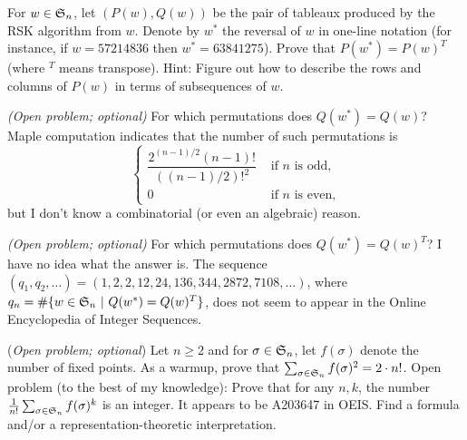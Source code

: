 \bigskip%

\prob
\probpart For $w\in\mathfrak{S}_n$, let $(P(w),Q(w))$ be the pair of tableaux produced by
the RSK algorithm from $w$.  Denote by $w^*$ the reversal of $w$ in one-line notation
(for instance, if $w=57214836$ then $w^*=63841275$).  Prove that $P(w^*)=P(w)^T$ (where ${}^T$ means transpose).
Hint: Figure out how to describe the rows and columns of $P(w)$ in terms of
subsequences of $w$.

\probpart \emph{(Open problem; optional)} For which permutations does  $Q(w^*)=Q(w)$?
Maple computation indicates that the number of such permutations is
  $$\begin{cases}
  \dfrac{2^{(n-1)/2}(n-1)!}{((n-1)/2)!^2} & \text{ if $n$ is odd,}\\
  0 & \text{ if $n$ is even,}
  \end{cases}$$
but I don't know a combinatorial (or even an algebraic) reason.

\probpart \emph{(Open problem; optional)} For which permutations does  $Q(w^*)=Q(w)^T$?  I have no idea what
the answer is. The sequence $(q_1,q_2,\dots)=(1,2,2,12,24,136,344,2872,7108,\dots)$, where
$q_n=\#\{w\in\mathfrak{S}_n~|~ Q(w^*)=Q(w)^T\}$,
does not seem to appear in the Online Encyclopedia of Integer Sequences.

\prob (\emph{Open problem; optional}) Let $n\geq 2$ and for $\sigma\in\mathfrak{S}_n$, let $f(\sigma)$ denote the number of fixed points.
As a warmup, prove that $\sum_{\sigma\in\mathfrak{S}_n} f(\sigma)^2=2\cdot n!$.
Open problem (to the best of my knowledge): Prove that for any $n,k$,
the number $\frac{1}{n!}\sum_{\sigma\in\mathfrak{S}_n} f(\sigma)^k$ is an integer.
It appears to be A203647 in OEIS.
Find a formula and/or a representation-theoretic interpretation.


